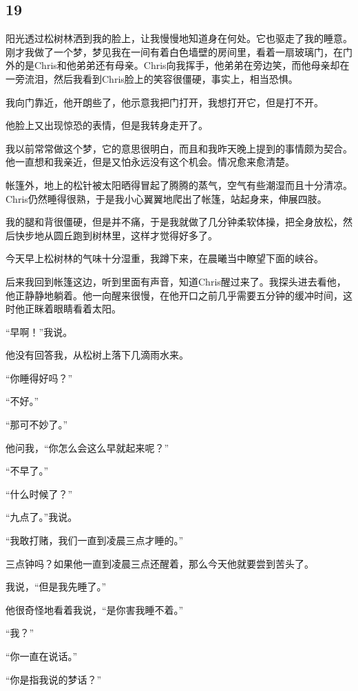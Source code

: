 \documentclass[UTF8]{article}
\begin{document}
\subsection*{19}
\par 阳光透过松树林洒到我的脸上，让我慢慢地知道身在何处。它也驱走了我的睡意。刚才我做了一个梦，梦见我在一间有着白色墙壁的房间里，看着一扇玻璃门，在门外的是Chris和他弟弟还有母亲。Chris向我挥手，他弟弟在旁边笑，而他母亲却在一旁流泪，然后我看到Chris脸上的笑容很僵硬，事实上，相当恐惧。
\par 我向门靠近，他开朗些了，他示意我把门打开，我想打开它，但是打不开。
\par 他脸上又出现惊恐的表情，但是我转身走开了。
\par 我以前常常做这个梦，它的意思很明白，而且和我昨天晚上提到的事情颇为契合。他一直想和我亲近，但是又怕永远没有这个机会。情况愈来愈清楚。
\par 帐篷外，地上的松针被太阳晒得冒起了腾腾的蒸气，空气有些潮湿而且十分清凉。Chris仍然睡得很熟，于是我小心翼翼地爬出了帐篷，站起身来，伸展四肢。
\par 我的腿和背很僵硬，但是并不痛，于是我就做了几分钟柔软体操，把全身放松，然后快步地从圆丘跑到树林里，这样才觉得好多了。
\par 今天早上松树林的气味十分湿重，我蹲下来，在晨曦当中瞭望下面的峡谷。
\par 后来我回到帐篷这边，听到里面有声音，知道Chris醒过来了。我探头进去看他，他正静静地躺着。他一向醒来很慢，在他开口之前几乎需要五分钟的缓冲时间，这时他正眯着眼睛看着太阳。
\par “早啊！”我说。
\par 他没有回答我，从松树上落下几滴雨水来。
\par “你睡得好吗？”
\par “不好。”
\par “那可不妙了。”
\par 他问我，“你怎么会这么早就起来呢？”
\par “不早了。”
\par “什么时候了？”
\par “九点了。”我说。
\par “我敢打赌，我们一直到凌晨三点才睡的。”
\par 三点钟吗？如果他一直到凌晨三点还醒着，那么今天他就要尝到苦头了。
\par 我说，“但是我先睡了。”
\par 他很奇怪地看着我说，“是你害我睡不着。”
\par “我？”
\par “你一直在说话。”
\par “你是指我说的梦话？”
\end{document}
